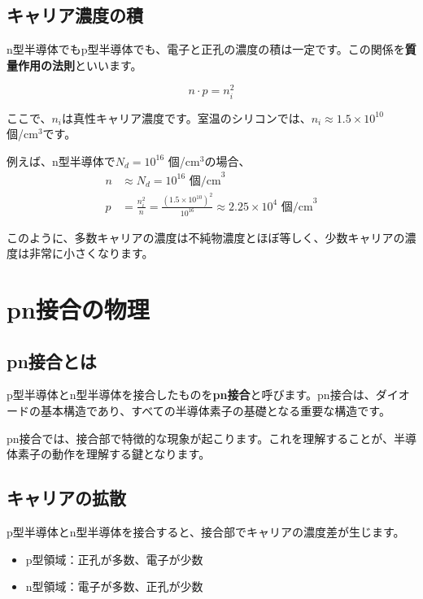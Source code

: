 \subsection{キャリア濃度の積}

n型半導体でもp型半導体でも、電子と正孔の濃度の積は一定です。この関係を\textbf{質量作用の法則}といいます。

\begin{equation}
n \cdot p = n_i^2
\end{equation}

ここで、$n_i$は真性キャリア濃度です。室温のシリコンでは、$n_i \approx 1.5 \times 10^{10}$ 個/cm$^3$です。

例えば、n型半導体で$N_d = 10^{16}$ 個/cm$^3$の場合、
\begin{align}
n &\approx N_d = 10^{16} \text{ 個/cm}^3 \\
p &= \frac{n_i^2}{n} = \frac{(1.5 \times 10^{10})^2}{10^{16}} \approx 2.25 \times 10^{4} \text{ 個/cm}^3
\end{align}

このように、多数キャリアの濃度は不純物濃度とほぼ等しく、少数キャリアの濃度は非常に小さくなります。


\section{pn接合の物理}

\subsection{pn接合とは}

p型半導体とn型半導体を接合したものを\textbf{pn接合}と呼びます。pn接合は、ダイオードの基本構造であり、すべての半導体素子の基礎となる重要な構造です。

pn接合では、接合部で特徴的な現象が起こります。これを理解することが、半導体素子の動作を理解する鍵となります。

\subsection{キャリアの拡散}

p型半導体とn型半導体を接合すると、接合部でキャリアの濃度差が生じます。

\begin{itemize}
\item p型領域：正孔が多数、電子が少数
\item n型領域：電子が多数、正孔が少数
\end{itemize}

